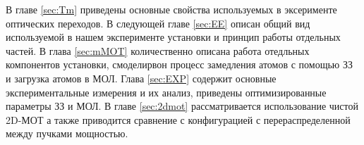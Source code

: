 В главе \ref{sec:Tm} приведены основные свойства используемых в эксерименте оптических переходов.  В следующей главе \ref{sec:EE} описан общий вид используемой в нашем эксперименте установки и принцип работы отдельных частей. В глава \ref{sec:mMOT}  количественно описана работа отедльных компонентов установки, смоделирвон процесс замедления атомов с помощью ЗЗ и загрузка атомов в МОЛ. Глава \ref{sec:EXP} содержит основные экспериментальные измерения и их анализ, приведены оптимизированные параметры ЗЗ и МОЛ. В главе \ref{sec:2dmot} рассматривается использование чистой 2D-МОТ а также приводится сравнение с конфигурацией с перераспределенной между пучками мощностью. 